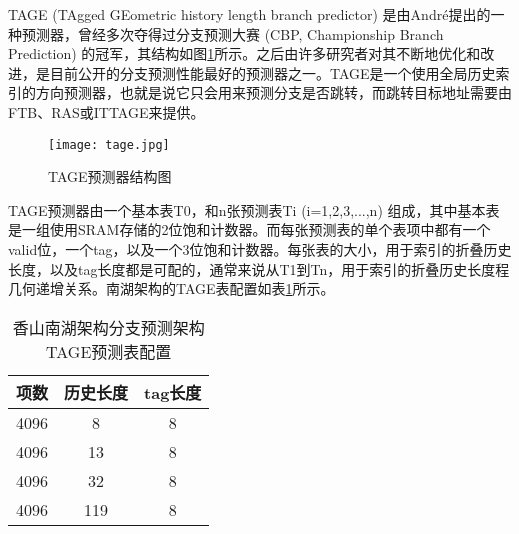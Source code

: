TAGE (TAgged GEometric history length branch predictor) 是由André提出的一种预测器\cite{tage}，曾经多次夺得过分支预测大赛 (CBP, Championship Branch Prediction) 的冠军，其结构如图\ref{fig:figure23}所示。之后由许多研究者对其不断地优化和改进，是目前公开的分支预测性能最好的预测器之一。TAGE是一个使用全局历史索引的方向预测器，也就是说它只会用来预测分支是否跳转，而跳转目标地址需要由FTB、RAS或ITTAGE来提供。


\begin{figure}[htb]
	\centering
	\setlength\tabcolsep{3pt}  %
	\vspace{5pt} %
	\texttt{[image: tage.jpg]}
	\caption{TAGE预测器结构图\cite{tage}}
	\label{fig:figure23}
\end{figure}

TAGE预测器由一个基本表T0，和n张预测表Ti (i=1,2,3,...,n) 组成，其中基本表是一组使用SRAM存储的2位饱和计数器。而每张预测表的单个表项中都有一个valid位，一个tag，以及一个3位饱和计数器。每张表的大小，用于索引的折叠历史长度，以及tag长度都是可配的，通常来说从T1到Tn，用于索引的折叠历史长度程几何递增关系。南湖架构的TAGE表配置如表\ref{tb:table21}所示。


\begin{table}[]
	\caption{香山南湖架构分支预测架构TAGE预测表配置}
	\label{tb:table21}
	\centering
    \begin{tabular}{ccc}
        \toprule
        项数 & 历史长度 & tag长度 \\
        \midrule
        4096 & 8 & 8 \\
        4096 & 13 & 8 \\
        4096 & 32 & 8 \\
		4096 & 119 & 8 \\
        \bottomrule
    \end{tabular}
\end{table}

